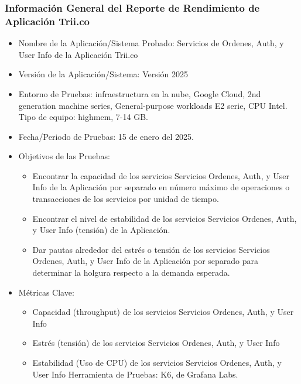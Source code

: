 \documentclass[
  paper=a4,
  ,captions=tableheading
]{scrartcl}
\providecommand{\tightlist}{%
  \setlength{\itemsep}{0pt}\setlength{\parskip}{0pt}}
\begin{document}
\subsubsection{Información General del Reporte de Rendimiento de
Aplicación
Trii.co}\label{sec:informaciuxf3n-general-del-reporte-de-rendimiento-de-aplicaciuxf3n-trii.co}

\begin{itemize}
\tightlist
\item
  Nombre de la Aplicación/Sistema Probado: Servicios de Ordenes, Auth, y
  User Info de la Aplicación Trii.co
\item
  Versión de la Aplicación/Sistema: Versión 2025
\item
  Entorno de Pruebas: infraestructura en la nube, Google Cloud, 2nd
  generation machine series, General-purpose workloads E2 serie, CPU
  Intel. Tipo de equipo: highmem, 7-14 GB.
\item
  Fecha/Periodo de Pruebas: 15 de enero del 2025.
\item
  Objetivos de las Pruebas:

  \begin{itemize}
  \tightlist
  \item
    Encontrar la capacidad de los servicios Servicios Ordenes, Auth, y
    User Info de la Aplicación por separado en número máximo de
    operaciones o transacciones de los servicios por unidad de tiempo.
  \item
    Encontrar el nivel de estabilidad de los servicios Servicios
    Ordenes, Auth, y User Info (tensión) de la Aplicación.
  \item
    Dar pautas alrededor del estrés o tensión de los servicios Servicios
    Ordenes, Auth, y User Info de la Aplicación por separado para
    determinar la holgura respecto a la demanda esperada.
  \end{itemize}
\item
  Métricas Clave:

  \begin{itemize}
  \tightlist
  \item
    Capacidad (throughput) de los servicios Servicios Ordenes, Auth, y
    User Info
  \item
    Estrés (tensión) de los servicios Servicios Ordenes, Auth, y User
    Info
  \item
    Estabilidad (Uso de CPU) de los servicios Servicios Ordenes, Auth, y
    User Info Herramienta de Pruebas: K6, de Grafana Labs.
  \end{itemize}
\end{itemize}
\end{document}
